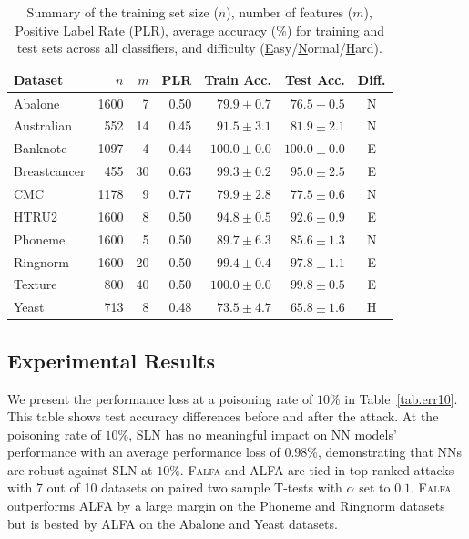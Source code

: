 \documentclass[runningheads]{llncs}
\newcommand{\falfa}{\textsc{Falfa}\xspace}
\begin{document}
\begin{table}[ht!]
    \footnotesize
    \centering
    \caption[Summary of Real-World Data]{Summary of the training set size ($n$), number of features ($m$), Positive Label Rate (PLR), average accuracy (\%) for training and test sets across all classifiers, and difficulty (\underline{E}asy/\underline{N}ormal/\underline{H}ard).
    }
    \begin{tabular}{@{\hskip2pt}l@{\hskip2pt}|@{\hskip2pt}r@{\hskip2pt}|@{\hskip2pt}r@{\hskip2pt}|@{\hskip2pt}r@{\hskip2pt}|@{\hskip2pt}r@{\hskip2pt}|@{\hskip2pt}r@{\hskip2pt}|@{\hskip1pt}c@{\hskip1pt}}
        \toprule
        Dataset      & $n$  & $m$ & PLR  & Train Acc.    & Test Acc.     & Diff. \\
        \midrule
        Abalone      & 1600 & 7   & 0.50 & $79.9\pm0.7$  & $76.5\pm0.5$  & N     \\
        Australian   & 552  & 14  & 0.45 & $91.5\pm3.1$  & $81.9\pm2.1$  & N     \\
        Banknote     & 1097 & 4   & 0.44 & $100.0\pm0.0$ & $100.0\pm0.0$ & E     \\
        Breastcancer & 455  & 30  & 0.63 & $99.3\pm0.2$  & $95.0\pm2.5$  & E     \\
        CMC          & 1178 & 9   & 0.77 & $79.9\pm2.8$  & $77.5\pm0.6$  & N     \\
        HTRU2        & 1600 & 8   & 0.50 & $94.8\pm0.5$  & $92.6\pm0.9$  & E     \\
        Phoneme      & 1600 & 5   & 0.50 & $89.7\pm6.3$  & $85.6\pm1.3$  & N     \\
        Ringnorm     & 1600 & 20  & 0.50 & $99.4\pm0.4$  & $97.8\pm1.1$  & E     \\
        Texture      & 800  & 40  & 0.50 & $100.0\pm0.0$ & $99.8\pm0.5$  & E     \\
        Yeast        & 713  & 8   & 0.48 & $73.5\pm4.7$  & $65.8\pm1.6$  & H     \\
        \bottomrule
    \end{tabular}
    \label{tab.datasets}
\end{table}


\subsection{Experimental Results}
We present the performance loss at a poisoning rate of $10\%$ in Table~\ref{tab.err10}.
This table shows test accuracy differences before and after the attack.
At the poisoning rate of $10\%$, SLN has no meaningful impact on NN models' performance with an average performance loss of $0.98\%$,  demonstrating that NNs are robust against SLN at $10\%$.
\falfa and ALFA are tied in top-ranked attacks with 7 out of 10 datasets on paired two sample T-tests with $\alpha$ set to $0.1$.
\falfa outperforms ALFA by a large margin on the Phoneme and Ringnorm datasets but is bested by ALFA on the Abalone and Yeast datasets.
\end{document}
